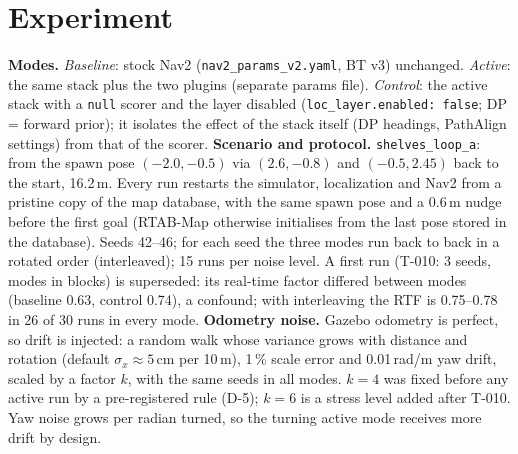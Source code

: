 \documentclass[10pt,twocolumn]{article}
\begin{document}
\section{Experiment}
\textbf{Modes.} \emph{Baseline}: stock Nav2 (\texttt{nav2\_params\_v2.yaml}, BT v3) unchanged. \emph{Active}: the same stack plus the two plugins (separate params file). \emph{Control}: the active stack with a \texttt{null} scorer and the layer disabled (\texttt{loc\_layer.enabled: false}; DP = forward prior); it isolates the effect of the stack itself (DP headings, PathAlign settings) from that of the scorer.
\textbf{Scenario and protocol.} \texttt{shelves\_loop\_a}: from the spawn pose $(-2.0,-0.5)$ via $(2.6,-0.8)$ and $(-0.5,2.45)$ back to the start, 16.2\,m.
Every run restarts the simulator, localization and Nav2 from a pristine copy of the map database, with the same spawn pose and a 0.6\,m nudge before the first goal (RTAB-Map otherwise initialises from the last pose stored in the database). Seeds 42--46; for each seed the three modes run back to back in a rotated order (interleaved); 15 runs per noise level.
A first run (T-010: 3 seeds, modes in blocks) is superseded: its real-time factor differed between modes (baseline 0.63, control 0.74), a confound; with interleaving the RTF is 0.75--0.78 in 26 of 30 runs in every mode.
\textbf{Odometry noise.} Gazebo odometry is perfect, so drift is injected: a random walk whose variance grows with distance and rotation (default $\sigma_x\approx5$\,cm per 10\,m), 1\,\% scale error and 0.01\,rad/m yaw drift, scaled by a factor $k$, with the same seeds in all modes. $k=4$ was fixed before any active run by a pre-registered rule (D-5); $k=6$ is a stress level added after T-010. Yaw noise grows per radian turned, so the turning active mode receives more drift by design.
\end{document}
